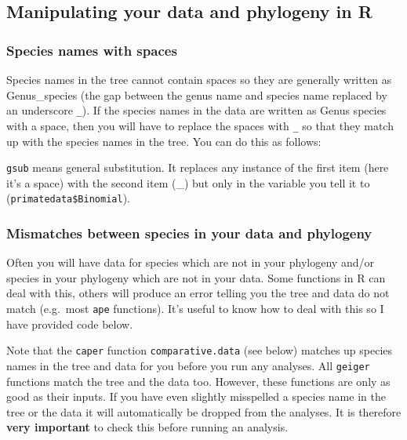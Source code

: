 \documentclass[]{book}
\newenvironment{Shaded}{\begin{snugshade}}{\end{snugshade}}
\newcommand{\KeywordTok}[1]{\textcolor[rgb]{0.13,0.29,0.53}{\textbf{{#1}}}}
\newcommand{\StringTok}[1]{\textcolor[rgb]{0.31,0.60,0.02}{{#1}}}
\newcommand{\NormalTok}[1]{{#1}}
\theoremstyle{definition}
\theoremstyle{definition}
\theoremstyle{definition}
\theoremstyle{remark}
\begin{document}
\subsection{Manipulating your data and phylogeny in
R}\label{manipulating-your-data-and-phylogeny-in-r}

\subsubsection{Species names with
spaces}\label{species-names-with-spaces}

Species names in the tree cannot contain spaces so they are generally
written as Genus\_species (the gap between the genus name and species
name replaced by an underscore \texttt{\_}). If the species names in the
data are written as Genus species with a space, then you will have to
replace the spaces with \texttt{\_} so that they match up with the
species names in the tree. You can do this as follows:

\begin{Shaded}
\end{Shaded}

\texttt{gsub} means general substitution. It replaces any instance of
the first item (here it's a space) with the second item (\_) but only in
the variable you tell it to (\texttt{primatedata\$Binomial}).

\subsubsection{Mismatches between species in your data and
phylogeny}\label{mismatches-between-species-in-your-data-and-phylogeny}

Often you will have data for species which are not in your phylogeny
and/or species in your phylogeny which are not in your data. Some
functions in R can deal with this, others will produce an error telling
you the tree and data do not match (e.g.~most \texttt{ape} functions).
It's useful to know how to deal with this so I have provided code below.

Note that the \texttt{caper} function \texttt{comparative.data} (see
below) matches up species names in the tree and data for you before you
run any analyses. All \texttt{geiger} functions match the tree and the
data too. However, these functions are only as good as their inputs. If
you have even slightly misspelled a species name in the tree or the data
it will automatically be dropped from the analyses. It is therefore
\textbf{very important} to check this before running an analysis.
\end{document}
